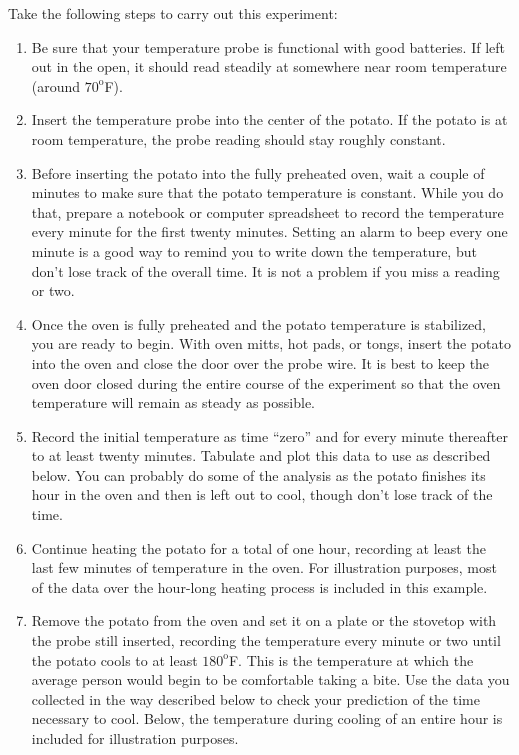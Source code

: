 \documentclass{ximera}
\begin{document}
Take the following steps to carry out this experiment:
\begin{enumerate}
\item Be sure that your temperature probe is functional with good batteries.  If left out in the open, it should read steadily at somewhere near room temperature (around $70^{\text{o}}$F).
\item Insert the temperature probe into the center of the potato.  If the potato is at room temperature, the probe reading should stay roughly constant.  
\item Before inserting the potato into the fully preheated oven, wait a couple of minutes to make sure that the potato temperature is constant.  While you do that, prepare a notebook or computer spreadsheet to record the temperature every minute for the first twenty minutes.  Setting an alarm to beep every one minute is a good way to remind you to write down the temperature, but don't lose track of the overall time.  It is not a problem if you miss a reading or two.
\item Once the oven is fully preheated and the potato temperature is stabilized, you are ready to begin.  With oven mitts, hot pads, or tongs, insert the potato into the oven and close the door over the probe wire.  It is best to keep the oven door closed during the entire course of the experiment so that the oven temperature will remain as steady as possible.
\item Record the initial temperature as time ``zero'' and for every minute thereafter to at least twenty minutes.  Tabulate and plot this data to use as described below.  You can probably do some of the analysis as the potato finishes its hour in the oven and then is left out to cool, though don't lose track of the time.
\item Continue heating the potato for a total of one hour, recording at least the last few minutes of temperature in the oven. For illustration purposes, most of the data over the hour-long heating process is included in this example.
\item Remove the potato from the oven and set it on a plate or the stovetop with the probe still inserted, recording the temperature every minute or two until the potato cools to at least $180^{\text{o}}$F.  This is the temperature at which the average person would begin to be comfortable taking a bite.  Use the data you collected in the way described below to check your prediction of the time necessary to cool.  Below, the temperature during cooling of an entire hour is included for illustration purposes.
\end{enumerate}
\end{document}
